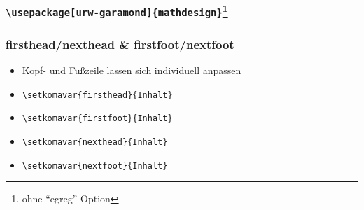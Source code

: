 \documentclass[12pt,ngerman]{beamer}
\begin{document}
\begin{frame}
\frametitle{\texttt{\textbackslash usepackage[urw-garamond]\{mathdesign\}}\footnote{ohne \enquote{egreg}-Option}}

\vspace*{-0.75cm}\begin{center}
\end{center}

\end{frame}

\begin{frame}[containsverbatim]
\frametitle{firsthead/nexthead \& firstfoot/nextfoot}

\begin{itemize}
\item Kopf- und Fußzeile lassen sich individuell anpassen
\item \verb|\setkomavar{firsthead}{Inhalt}|
\item \verb|\setkomavar{firstfoot}{Inhalt}|
\item \verb|\setkomavar{nexthead}{Inhalt}|
\item \verb|\setkomavar{nextfoot}{Inhalt}|
\end{itemize}
\end{frame}
\end{document}
